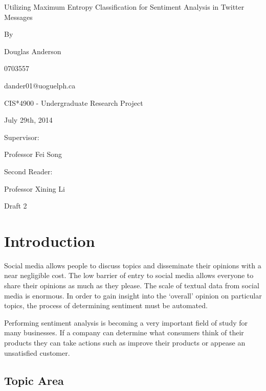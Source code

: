 \documentclass[12pt]{article}
\begin{document}
\thispagestyle{empty}
\begin{center}

\huge

Utilizing Maximum Entropy Classification for Sentiment Analysis in Twitter
Messages

\large
\vspace{2.0cm}
By

\vspace{1.0cm}
Douglas Anderson

0703557

dander01@uoguelph.ca

\vspace{1.5cm}
CIS*4900 - Undergraduate Research Project

July 29th, 2014 %

\vspace{1.5cm}

Supervisor:

Professor Fei Song

\vspace{1.5cm}

Second Reader:

Professor Xining Li

\vspace{1.5cm}

Draft 2 %

\end{center}

\newpage
\setcounter{page}{1}

\section{Introduction}

Social media allows people to discuss topics and disseminate their opinions
with a near negligible cost. The low barrier of entry to social media allows
everyone to share their opinions as much as they please. The scale of textual
data from social media is enormous. In order to gain insight into the `overall'
opinion on particular topics, the process of determining sentiment must be
automated.

Performing sentiment analysis is becoming a very important field of study for
many businesses. If a company can determine what consumers think of their
products they can take actions such as improve their products or appease an
unsatisfied customer.

\subsection{Topic Area}
\end{document}
